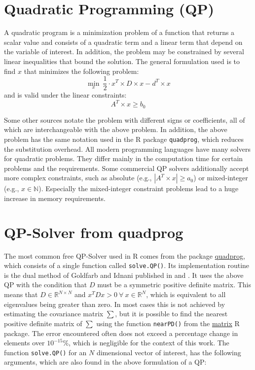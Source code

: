 \documentclass[
  oneside]{book}
\begin{document}
\hypertarget{quadratic-programming-qp}{%
\section{Quadratic Programming (QP)}\label{quadratic-programming-qp}}

A quadratic program is a minimization problem of a function that returns a scalar value and consists of a quadratic term and a linear term that depend on the variable of interest. In addition, the problem may be constrained by several linear inequalities that bound the solution. The general formulation used is to find \(x\) that minimizes the following problem:
\[
  \min\limits_{x} \ \frac{1}{2} \cdot x^T \times D \times x - d^T \times x 
\]
and is valid under the linear constraints:
\[
  A^T \times x \geq b_0
\]

Some other sources notate the problem with different signs or coefficients, all of which are interchangeable with the above problem. In addition, the above problem has the same notation used in the R package \texttt{quadprog}, which reduces the substitution overhead. All modern programming languages have many solvers for quadratic problems. They differ mainly in the computation time for certain problems and the requirements. Some commercial QP solvers additionally accept more complex constraints, such as absolute (e.g., \(|A^T \times x| \geq a_0\)) or mixed-integer (e.g., \(x \in \mathbb{N}\)). Especially the mixed-integer constraint problems lead to a huge increase in memory requirements.

\hypertarget{qp-solver-from-quadprog}{%
\section{QP-Solver from quadprog}\label{qp-solver-from-quadprog}}

The most common free QP-Solver used in R comes from the package \href{https://cran.r-project.org/web/packages/quadprog/quadprog.pdf}{quadprog}, which consists of a single function called \texttt{solve.QP()}. Its implementation routine is the dual method of Goldfarb and Idnani published in \citep{GoId1982} and \citep{GoId1983}. It uses the above QP with the condition that \(D\) must be a symmetric positive definite matrix. This means that \(D\in \mathbb{R}^{N \times N}\) and \(x^T D x > 0 \ \forall \ x \in \mathbb{R}^N\), which is equivalent to all eigenvalues being greater than zero. In most cases this is not achieved by estimating the covariance matrix \(\sum\), but it is possible to find the nearest positive definite matrix of \(\textstyle\sum\) using the function \texttt{nearPD()} from the \href{https://cran.r-project.org/web/packages/Matrix/Matrix.pdf}{matrix} R package. The error encountered often does not exceed a percentage change in elements over \(10^{-15} \%\), which is negligible for the context of this work. The function \texttt{solve.QP()} for an \(N\) dimensional vector of interest, has the following arguments, which are also found in the above formulation of a QP:
\end{document}
